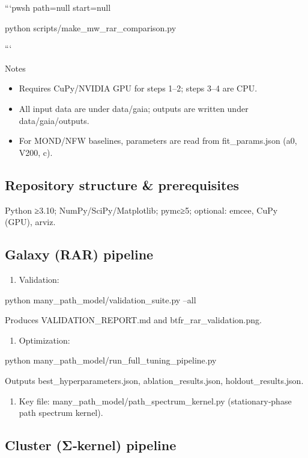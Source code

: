 \documentclass[11pt,a4paper]{article}
\begin{document}
```pwsh path=null start=null

python scripts/make\_mw\_rar\_comparison.py

```


Notes

\begin{itemize}
\item Requires CuPy/NVIDIA GPU for steps 1–2; steps 3–4 are CPU.
\item All input data are under data/gaia; outputs are written under data/gaia/outputs.
\item For MOND/NFW baselines, parameters are read from fit\_params.json (a0, V200, c).
\end{itemize}


\subsection{Repository structure \& prerequisites}


Python ≥3.10; NumPy/SciPy/Matplotlib; pymc≥5; optional: emcee, CuPy (GPU), arviz.


\subsection{Galaxy (RAR) pipeline}


\begin{enumerate}
\item Validation:
\end{enumerate}

python many\_path\_model/validation\_suite.py --all  

Produces VALIDATION\_REPORT.md and btfr\_rar\_validation.png.


\begin{enumerate}
\item Optimization:
\end{enumerate}

python many\_path\_model/run\_full\_tuning\_pipeline.py  

Outputs best\_hyperparameters.json, ablation\_results.json, holdout\_results.json.


\begin{enumerate}
\item Key file: many\_path\_model/path\_spectrum\_kernel.py (stationary‑phase path spectrum kernel).
\end{enumerate}


\subsection{Cluster (Σ‑kernel) pipeline}
\end{document}
